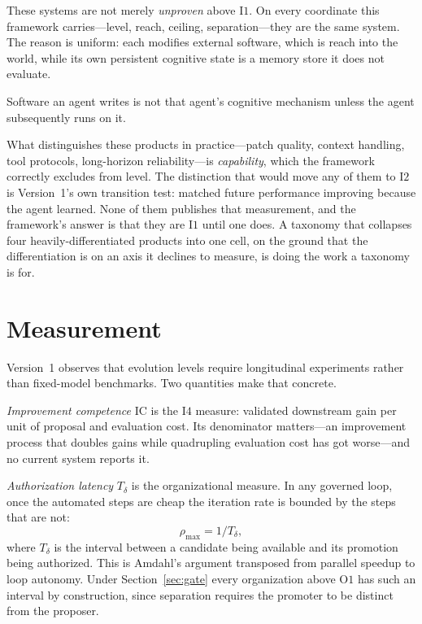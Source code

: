 \documentclass[11pt]{article}
\newcommand{\Ilev}[1]{\ensuremath{\mathrm{I}#1}}
\newcommand{\Olev}[1]{\ensuremath{\mathrm{O}#1}}
\newcommand{\Td}{\ensuremath{T_\delta}}
\begin{document}
These systems are not merely \emph{unproven} above \Ilev{1}. On every coordinate this framework carries---level, reach, ceiling, separation---they are the same system. The reason is uniform: each modifies external software, which is reach into the world, while its own persistent cognitive state is a memory store it does not evaluate.

\begin{claimbox}{}
Software an agent writes is not that agent's cognitive mechanism unless the agent subsequently runs on it.
\end{claimbox}

What distinguishes these products in practice---patch quality, context handling, tool protocols, long-horizon reliability---is \emph{capability}, which the framework correctly excludes from level. The distinction that would move any of them to \Ilev{2} is Version~1's own transition test: matched future performance improving because the agent learned. None of them publishes that measurement, and the framework's answer is that they are \Ilev{1} until one does. A taxonomy that collapses four heavily-differentiated products into one cell, on the ground that the differentiation is on an axis it declines to measure, is doing the work a taxonomy is for.

\section{Measurement}\label{sec:measurement}

Version~1 observes that evolution levels require longitudinal experiments rather than fixed-model benchmarks. Two quantities make that concrete.

\emph{Improvement competence} $\mathrm{IC}$ is the \Ilev{4} measure: validated downstream gain per unit of proposal and evaluation cost. Its denominator matters---an improvement process that doubles gains while quadrupling evaluation cost has got worse---and no current system reports it.

\emph{Authorization latency} \Td{} is the organizational measure. In any governed loop, once the automated steps are cheap the iteration rate is bounded by the steps that are not:
\[
\rho_{\max} = 1/\Td{},
\]
where \Td{} is the interval between a candidate being available and its promotion being authorized. This is Amdahl's argument \citep{amdahl1967validity} transposed from parallel speedup to loop autonomy. Under Section~\ref{sec:gate} every organization above \Olev{1} has such an interval by construction, since separation requires the promoter to be distinct from the proposer.
\end{document}
